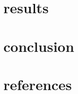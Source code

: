 \documentclass{article}
\begin{document}
\section{results}

\section{conclusion}

\section{references}
\end{document}
